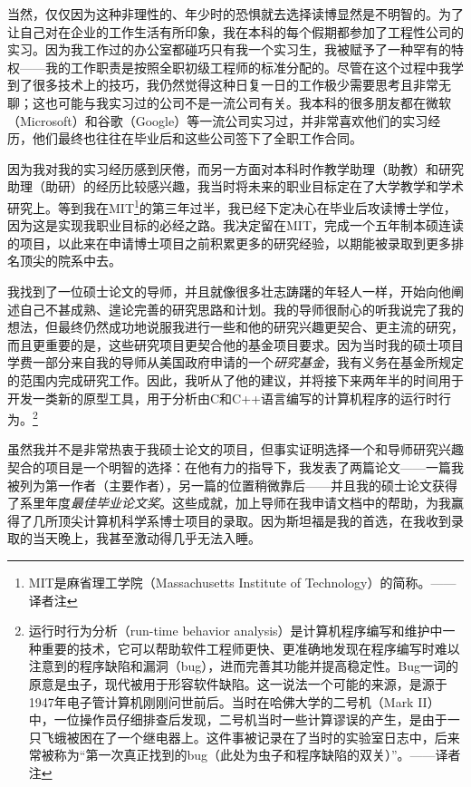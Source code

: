 \documentclass[letter,12pt]{book}
\begin{document}
\begin{CJK}{UTF8}{gbsn}
当然，仅仅因为这种非理性的、年少时的恐惧就去选择读博显然是不明智的。为了让自己对在企业的工作生活有所印象，我在本科的每个假期都参加了工程性公司的实习。因为我工作过的办公室都碰巧只有我一个实习生，我被赋予了一种罕有的特权——我的工作职责是按照全职初级工程师的标准分配的。尽管在这个过程中我学到了很多技术上的技巧，我仍然觉得这种日复一日的工作极少需要思考且非常无聊；这也可能与我实习过的公司不是一流公司有关。我本科的很多朋友都在微软（Microsoft）和谷歌（Google）等一流公司实习过，并非常喜欢他们的实习经历，他们最终也往往在毕业后和这些公司签下了全职工作合同。

因为我对我的实习经历感到厌倦，而另一方面对本科时作教学助理（助教）和研究助理（助研）的经历比较感兴趣，我当时将未来的职业目标定在了大学教学和学术研究上。等到我在MIT\footnote{MIT是麻省理工学院（Massachusetts Institute of Technology）的简称。——译者注}的第三年过半，我已经下定决心在毕业后攻读博士学位，因为这是实现我职业目标的必经之路。我决定留在MIT，完成一个五年制本硕连读的项目，以此来在申请博士项目之前积累更多的研究经验，以期能被录取到更多排名顶尖的院系中去。

我找到了一位硕士论文的导师，并且就像很多壮志踌躇的年轻人一样，开始向他阐述自己不甚成熟、遑论完善的研究思路和计划。我的导师很耐心的听我说完了我的想法，但最终仍然成功地说服我进行一些和他的研究兴趣更契合、更主流的研究，而且更重要的是，这些研究项目更契合他的基金项目要求。因为当时我的硕士项目学费一部分来自我的导师从美国政府申请的一个\emph{研究基金}，我有义务在基金所规定的范围内完成研究工作。因此，我听从了他的建议，并将接下来两年半的时间用于开发一类新的原型工具，用于分析由C和C++语言编写的计算机程序的运行时行为。\footnote{运行时行为分析（run-time behavior analysis）是计算机程序编写和维护中一种重要的技术，它可以帮助软件工程师更快、更准确地发现在程序编写时难以注意到的程序缺陷和漏洞（bug），进而完善其功能并提高稳定性。Bug一词的原意是虫子，现代被用于形容软件缺陷。这一说法一个可能的来源，是源于1947年电子管计算机刚刚问世前后。当时在哈佛大学的二号机（Mark II）中，一位操作员仔细排查后发现，二号机当时一些计算谬误的产生，是由于一只飞蛾被困在了一个继电器上。这件事被记录在了当时的实验室日志中，后来常被称为“第一次真正找到的bug（此处为虫子和程序缺陷的双关）”。——译者注}

虽然我并不是非常热衷于我硕士论文的项目，但事实证明选择一个和导师研究兴趣契合的项目是一个明智的选择：在他有力的指导下，我发表了两篇论文——一篇我被列为第一作者（主要作者），另一篇的位置稍微靠后——并且我的硕士论文获得了系里年度\emph{最佳毕业论文奖}。这些成就，加上导师在我申请文档中的帮助，为我赢得了几所顶尖计算机科学系博士项目的录取。因为斯坦福是我的首选，在我收到录取的当天晚上，我甚至激动得几乎无法入睡。


\end{CJK}
\end{document}
